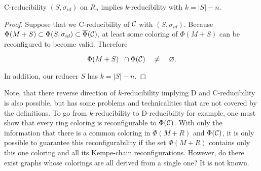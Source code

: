 \begin{theorem}
    C-reducibility $(S, \sigma_{id})$ on $R_n$ implies $k$-reducibility with $k = |S|-n$.
\end{theorem}

\begin{proof}
Suppose that we C-reducibility of $\mathcal{C}$ with $(S, \sigma_{id})$. Because $\Phi(M+ S) \subset \Phi(S, \sigma_{id}) \subset \overline{\Phi}(\mathcal{C})$, at least some coloring of $\Phi(M+S)$ can be reconfigured to become valid. Therefore

\begin{equation}
    \Phi(M+S) \;\; \cap \Phi(\mathcal{C}) \quad \neq \quad \varnothing.
\end{equation}

In addition, our reducer $S$ has $k = |S| - n$.

\end{proof}

Note, that there reverse direction of $k$-reducibility implying D and C-reducibility is also possible, but has some problems and technicalities that are not covered by the definitions. To go from $k$-reducibility to D-reducibility for example, one must show that every ring coloring is reconfigurable to $\Phi(\mathcal{C})$. With only the information that there is a common coloring in $\Phi(M+R)$ and $\Phi(\mathcal{C})$, it is only possible to guarantee this reconfigurability if the set $\Phi(M+R)$ contains only this one coloring and all its Kempe-chain reconfigurations. However, do there exist graphs whose colorings are all derived from a single one? It is not known.